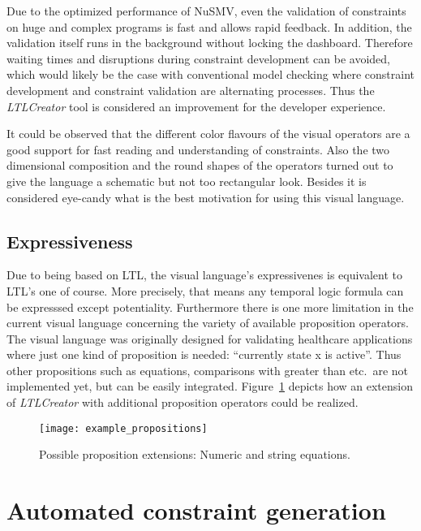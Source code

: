 Due to the optimized performance of NuSMV, even the validation of constraints on huge and complex programs is fast and allows rapid feedback. In addition, the validation itself runs in the background without locking the dashboard. Therefore waiting times and disruptions during constraint development can be avoided, which would likely be the case with conventional model checking where constraint development and constraint validation are alternating processes. Thus the \emph{LTLCreator} tool is considered an improvement for the developer experience.

It could be observed that the different color flavours of the visual operators are a good support for fast reading and understanding of constraints. Also the two dimensional composition and the round shapes of the operators turned out to give the language a schematic but not too rectangular look. Besides it is considered eye-candy what is the best motivation for using this visual language.





\subsection{Expressiveness}

Due to being based on LTL, the visual language's expressivenes is equivalent to LTL's one of course. More precisely, that means any temporal logic formula can be expresssed except potentiality.
Furthermore there is one more limitation in the current visual language concerning the variety of available proposition operators. The visual language was originally designed for validating healthcare applications where just one kind of proposition is needed: ``currently state x is active''. Thus other propositions such as equations, comparisons with greater than etc.\ are not implemented yet, but can be easily integrated.
Figure~\ref{fig:example_propositions} depicts how an extension of \emph{LTLCreator} with additional proposition operators could be realized.

\begin{figure}[htbp]
  \centering
  \texttt{[image: example\_propositions]}
  \caption{Possible proposition extensions: Numeric and string equations.}
  \label{fig:example_propositions}
\end{figure}



\section{Automated constraint generation}
\label{sec:testscenarioandevaluation_automatedconstraintgeneration}

